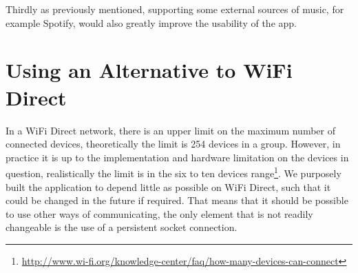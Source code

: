 Thirdly as previously mentioned, supporting some external sources of music, for example Spotify, would also greatly improve the usability of the app.

\section{Using an Alternative to WiFi Direct}
In a WiFi Direct network, there is an upper limit on the maximum number of connected devices, theoretically the limit is 254 devices in a group.
However, in practice it is up to the implementation and hardware limitation on the devices in question, realistically the limit is in the six to ten devices range\footnote{\url{http://www.wi-fi.org/knowledge-center/faq/how-many-devices-can-connect}}.
We purposely built the application to depend little as possible on WiFi Direct, such that it could be changed in the future if required.
That means that it should be possible to use other ways of communicating, the only element that is not readily changeable is the use of a persistent socket connection.


